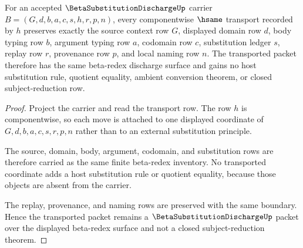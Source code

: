 \begin{theorem}
\label{thm:beta-substitution-discharge-component-transport}
For an accepted $\BetaSubstitutionDischargeUp$ carrier $B=(G,d,b,a,c,s,h,r,p,n)$, every componentwise $\hsame$ transport recorded by $h$ preserves exactly the source context row $G$, displayed domain row $d$, body typing row $b$, argument typing row $a$, codomain row $c$, substitution ledger $s$, replay row $r$, provenance row $p$, and local naming row $n$. The transported packet therefore has the same beta-redex discharge surface and gains no host substitution rule, quotient equality, ambient conversion theorem, or closed subject-reduction row.
\end{theorem}
\begin{proof}
Project the carrier and read the transport row. The row $h$ is componentwise, so each move is attached to one displayed coordinate of $G,d,b,a,c,s,r,p,n$ rather than to an external substitution principle.

The source, domain, body, argument, codomain, and substitution rows are therefore carried as the same finite beta-redex inventory. No transported coordinate adds a host substitution rule or quotient equality, because those objects are absent from the carrier.

The replay, provenance, and naming rows are preserved with the same boundary. Hence the transported packet remains a $\BetaSubstitutionDischargeUp$ packet over the displayed beta-redex surface and not a closed subject-reduction theorem.
\end{proof}

